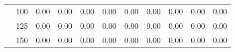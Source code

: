 \begin{table}[t]
\begin{center}
\begin{subtable}[c]{\textwidth}
\begin{center}
\begin{tabular}{rcccccccccc}
                                        & \multicolumn{1}{c|}{100}  & \num{0.00}  & \num{0.00}  & \num{0.00}  & \num{0.00}  & \num{0.00}  & \num{0.00}  & \num{0.00}  & \num{0.00}  & \num{0.00}  \\
                                        & \multicolumn{1}{c|}{125}  & \num{0.00}  & \num{0.00}  & \num{0.00}  & \num{0.00}  & \num{0.00}  & \num{0.00}  & \num{0.00}  & \num{0.00}  & \num{0.00}  \\
                                        & \multicolumn{1}{c|}{150}  & \num{0.00}  & \num{0.00}  & \num{0.00}  & \num{0.00}  & \num{0.00}  & \num{0.00}  & \num{0.00}  & \num{0.00}  & \num{0.00}  \\
                                    \end{tabular}
            \end{center}
        \end{subtable}

        \vspace{5mm}


\end{center}
\end{table}
